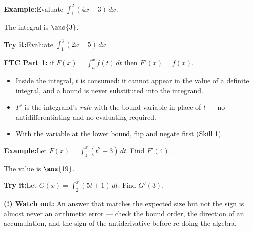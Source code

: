\documentclass[12pt]{article}
\begin{document}
\begin{examplebox}
\textbf{Example:}\quad Evaluate $\displaystyle\int_{1}^{2} (4x - 3)\,dx$.

The integral is $\ans{3}$.
\end{examplebox}

\begin{tryitbox}
\textbf{Try it:}\quad Evaluate $\displaystyle\int_{1}^{3} (2x - 5)\,dx$.\\[2pt]
\end{tryitbox}


\begin{formulabox}
\textbf{FTC Part 1:} if $F(x) = \displaystyle\int_a^x f(t)\,dt$ then
$F'(x) = f(x)$.
\begin{itemize}[leftmargin=0.8cm, itemsep=1pt, topsep=2pt]
  \item Inside the integral, $t$ is consumed: it cannot appear in the value of a
        definite integral, and a bound is never substituted into the integrand.
  \item $F'$ is the integrand's \emph{rule} with the bound variable in place of
        $t$ --- no antidifferentiating and no evaluating required.
  \item With the variable at the lower bound, flip and negate first (Skill 1).
\end{itemize}
\end{formulabox}

\begin{examplebox}
\textbf{Example:}\quad Let $F(x) = \displaystyle\int_{1}^{x} (t^2 + 3)\,dt$. Find
$F'(4)$.

The value is $\ans{19}$.
\end{examplebox}

\begin{tryitbox}
\textbf{Try it:}\quad Let $G(x) = \displaystyle\int_{2}^{x} (5t + 1)\,dt$. Find
$G'(3)$.\\[2pt]
\end{tryitbox}

\begin{watchoutbox}
\textbf{(!) Watch out:} An answer that matches the expected size but not the sign
is almost never an arithmetic error --- check the bound order, the direction of
an accumulation, and the sign of the antiderivative before re-doing the algebra.
\end{watchoutbox}
\end{document}
